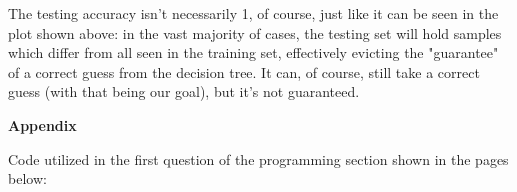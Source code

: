 \documentclass[12pt]{article}
\begin{document}
\begin{enumerate}[leftmargin=\labelsep,resume]
The testing accuracy isn't necessarily 1, of course, just like it can be seen in the plot shown above: in the vast majority of cases, the testing set will hold samples which differ from all seen in the training set, effectively evicting the "guarantee" of a correct guess from the decision tree. It can, of course, still take a correct guess (with that being our goal), but it's not guaranteed.

\end{enumerate}

\large{\textbf{Appendix}\vskip 0.3cm}

Code utilized in the first question of the programming section shown in the pages below:


\end{document}
